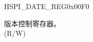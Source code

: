 \begin{register}{H}{SPI\_DATE\_REG}{0x00F0}\label{regdesc:SPIDATEREG}
%
%
\regnewline%
\begin{regdesc}\begin{reglist}
\label{fielddesc:SPIDATE}\item [SPI\_DATE] 版本控制寄存器。\\
(R/W)
\end{reglist}\end{regdesc}
\end{register}